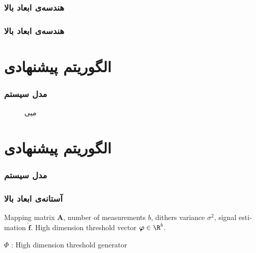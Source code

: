 \begin{frame}
\frametitle{هندسه‌ی ابعاد بالا}
\framesubtitle{}
\end{frame}

\begin{frame}
\frametitle{هندسه‌ی ابعاد بالا}
\framesubtitle{}
\end{frame}


\section{الگوریتم پیشنهادی\hfill}

\begin{frame}
\frametitle{مدل سیستم}

\begin{figure}[t]
	\centering
	
	\caption{میی}
	\label{fig:AdaptiveBD}
\end{figure}
\end{frame}



\section{الگوریتم پیشنهادی\hfill}

\begin{frame}
\frametitle{مدل سیستم}

\end{frame}
\begin{frame}
\frametitle{آستانه‌ی ابعاد بالا}
\begin{latin}
\begin{algorithm}[H]
\begin{algorithmic}[1]
\renewcommand{\algorithmicrequire}{\textbf{Input:}}
\renewcommand{\algorithmicensure}{\textbf{Output:}}
\REQUIRE Mapping matrix $ \bm{A} $, number of measurements $ b $, dithers variance $ \sigma^{2} $, signal estimation $ \hat{\bm{f}} $.
\ENSURE High dimension threshold vector $\bm{\varphi}\in \R^{b}$.
\end{algorithmic} 
\caption{ $\Phi$ : High dimension threshold generator}
\label{alg:HDTG}
\end{algorithm}
\end{latin}
\end{frame}

